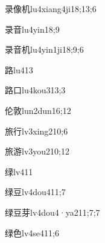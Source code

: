 \begin{verbete}{录像机}{lu4xiang4ji1}{8;13;6}
\end{verbete}
\begin{verbete}{录音}{lu4yin1}{8;9}
\end{verbete}
\begin{verbete}{录音机}{lu4yin1ji1}{8;9;6}
\end{verbete}
\begin{verbete}{路}{lu4}{13}
\end{verbete}
\begin{verbete}[13;3]{路口}{lu4kou3}{13;3}
\end{verbete}
\begin{verbete}{伦敦}{lun2dun1}{6;12}
\end{verbete}
\begin{verbete}{旅行}{lv3xing2}{10;6}
\end{verbete}
\begin{verbete}{旅游}{lv3you2}{10;12}
\end{verbete}
\begin{verbete}{绿}{lv4}{11}
\end{verbete}
\begin{verbete}{绿豆}{lv4dou4}{11;7}
\end{verbete}
\begin{verbete}{绿豆芽}{lv4dou4·ya2}{11;7;7}
\end{verbete}
\begin{verbete}{绿色}{lv4se4}{11;6}
\end{verbete}

